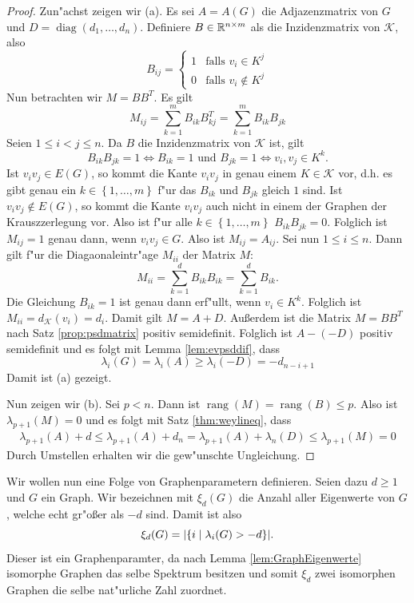 \begin{proof}
  Zun"achst zeigen wir (a). Es sei $A=A(G)$ die Adjazenzmatrix von $G$ und $D = \operatorname{diag}(d_1,\dots,d_n)$. Definiere $B\in{\mathbb{R}}^{n\times m}$ als die Inzidenzmatrix von $\mathcal K$, also $$B_{ij} = \begin{cases}
    1 & \text{falls } v_i \in K^j \\ 0 & \text{falls }v_i \notin K^j
  \end{cases}$$ 
  Nun betrachten wir $M=BB^{T}$. Es gilt
  \[
    M_{ij} = \sum\limits_{k=1}^{m}B_{ik}B^{T}_{kj} = \sum\limits_{k=1}^{m}B_{ik}B_{jk}
  \]
  Seien $1\leq i < j \leq n$. Da $B$ die Inzidenzmatrix von $\mathcal{K}$ ist, gilt  $$ B_{ik} B_{jk} = 1 \Leftrightarrow B_{ik} = 1 \text{ und } B_{jk} = 1 \Leftrightarrow v_i,v_j \in K^{k}.$$ Ist $v_iv_j \in E(G)$, so kommt die Kante $v_iv_j$ in genau einem $K\in \mathcal{K}$ vor, d.h. es gibt genau ein $k\in \left\{ 1,\dots,m \right\}$ f"ur das $B_{ik}$ und $B_{jk}$ gleich $1$ sind. Ist $v_iv_j\notin E(G)$, so kommt die Kante $v_iv_j$ auch nicht in einem der Graphen der Krauszzerlegung vor.
  Also ist f"ur alle $k\in \left\{ 1,\dots, m \right\}$ $B_{ik}B_{jk} = 0$. Folglich ist $M_{ij}=1$ genau dann, wenn $v_iv_j\in G$. Also ist $M_{ij} = A_{ij}$.
  Sei nun $1\leq i \leq n$. Dann gilt f"ur die Diagaonaleintr"age $M_{ii}$ der Matrix $M$:
  \[
    M_{ii} = \sum\limits_{k=1}^{d}B_{ik}B_{ik} = \sum\limits_{k=1}^{d} B_{ik}.
  \]
  Die Gleichung $B_{ik}=1$ ist genau dann erf"ullt, wenn $v_i \in K^k$. Folglich ist $M_{ii}= d_{\mathcal{K}}(v_i)= d_i$. Damit gilt $M=A+D$. Au{\ss}erdem ist die Matrix $M=BB^{T}$ nach Satz \ref{prop:psdmatrix} positiv semidefinit.
  Folglich ist $A- (-D)$ positiv semidefinit und es folgt mit Lemma \ref{lem:evpsddif}, dass 
  \begin{equation*}
    \lambda_i(G) = \lambda_i(A) \geq \lambda_i(-D) = -d_{n-i+1}
  \end{equation*}
  Damit ist (a) gezeigt.

  Nun zeigen wir (b). Sei $p<n$. Dann ist $\operatorname{rang}(M)= \operatorname{rang}(B) \leq p$. Also ist $\lambda_{p+1}(M) = 0$ und es folgt mit Satz \ref{thm:weylineq}, dass 
  \begin{align*}
    \lambda_{p+1}(A) + d \leq \lambda_{p+1}(A) + d_{n} = \lambda_{p+1}(A) + \lambda_{n} (D) \leq \lambda_{p+1} (M) = 0
  \end{align*}
  Durch Umstellen erhalten wir die gew"unschte Ungleichung.
\end{proof}

Wir wollen nun eine Folge von Graphenparametern definieren. Seien dazu $d\geq 1$ und $G$ ein Graph. Wir bezeichnen mit $\xi_{d}(G)$ die Anzahl aller Eigenwerte von $G$, welche echt gr"o{\ss}er als $-d$ sind. Damit ist also 
$$\xi_{d}(G) = |\{i \;|\; \lambda_i(G) > -d \}|.$$
Dieser ist ein Graphenparamter, da nach Lemma \ref{lem:GraphEigenwerte} isomorphe Graphen das selbe Spektrum besitzen und somit $\xi_d $ zwei isomorphen Graphen die selbe nat"urliche Zahl zuordnet. 

